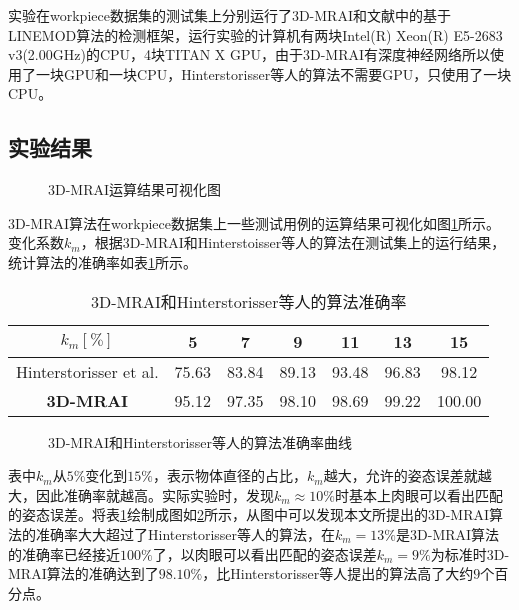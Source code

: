 实验在workpiece数据集的测试集上分别运行了3D-MRAI和文献\cite{hinterstoisser2012model}中的基于LINEMOD算法的检测框架，运行实验的计算机有两块Intel(R) Xeon(R) E5-2683 v3(2.00GHz)的CPU，4块TITAN X GPU，由于3D-MRAI有深度神经网络所以使用了一块GPU和一块CPU，Hinterstorisser等人的算法不需要GPU，只使用了一块CPU。

\subsection{实验结果}
\begin{figure}[ht]
  \centering
  \hskip0.2cm
  \hskip0.2cm
  \caption{3D-MRAI运算结果可视化图}
  \label{fig:3dmrai-res}
\end{figure}
3D-MRAI算法在workpiece数据集上一些测试用例的运算结果可视化如图\ref{fig:3dmrai-res}所示。变化系数$k_m$，根据3D-MRAI和Hinterstoisser等人的算法在测试集上的运行结果，统计算法的准确率如表\ref{tab:mrai}所示。
\begin{table}[ht]
  \centering
  \caption{3D-MRAI和Hinterstorisser等人的算法准确率}
  \begin{tabular}{ccccccc}
    \toprule
    $k_m[\%]$&5&7&9&11&13&15\\
    \midrule
    Hinterstorisser et al.&75.63& 83.84& 89.13& 93.48& 96.83&98.12\\
    \bf{3D-MRAI}&95.12& 97.35& 98.10& 98.69& 99.22& 100.00\\
    \bottomrule
  \end{tabular}
  \label{tab:mrai}
\end{table}
\begin{figure}[ht]
  \centering
  \caption{3D-MRAI和Hinterstorisser等人的算法准确率曲线}
  \label{fig:mrai}
\end{figure}
表中$k_m$从$5\%$变化到$15\%$，表示物体直径的占比，$k_m$越大，允许的姿态误差就越大，因此准确率就越高。实际实验时，发现$k_m\approx 10\%$时基本上肉眼可以看出匹配的姿态误差。将表\ref{tab:mrai}绘制成图如\ref{fig:mrai}所示，从图中可以发现本文所提出的3D-MRAI算法的准确率大大超过了Hinterstorisser等人的算法，在$k_m=13\%$是3D-MRAI算法的准确率已经接近$100\%$了，以肉眼可以看出匹配的姿态误差$k_m=9\%$为标准时3D-MRAI算法的准确达到了$98.10\%$，比Hinterstorisser等人提出的算法高了大约$9$个百分点。

